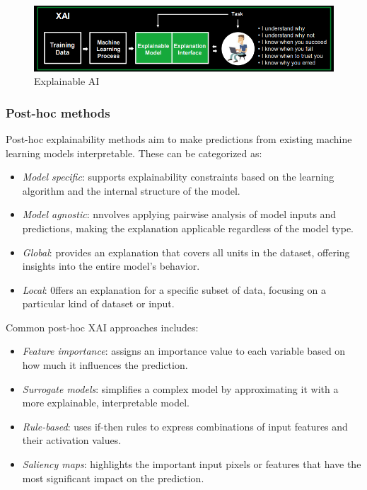\begin{figure}[H]
    \centering
    \includegraphics[width=0.5\linewidth]{images/bis6.png}
    \caption{Explainable AI}
\end{figure}

\subsubsection{Post-hoc methods}
Post-hoc explainability methods aim to make predictions from existing machine learning models interpretable. 
These can be categorized as:
\begin{itemize}
    \item \textit{Model specific}: supports explainability constraints based on the learning algorithm and the internal structure of the model.
    \item \textit{Model agnostic}: nnvolves applying pairwise analysis of model inputs and predictions, making the explanation applicable regardless of the model type.
    \item \textit{Global}: provides an explanation that covers all units in the dataset, offering insights into the entire model's behavior.
    \item \textit{Local}: 0ffers an explanation for a specific subset of data, focusing on a particular kind of dataset or input.
\end{itemize}
\noindent Common post-hoc XAI approaches includes:
\begin{itemize}
    \item \textit{Feature importance}: assigns an importance value to each variable based on how much it influences the prediction. 
    \item \textit{Surrogate models}: simplifies a complex model by approximating it with a more explainable, interpretable model.
    \item \textit{Rule-based}: uses if-then rules to express combinations of input features and their activation values.
    \item \textit{Saliency maps}: highlights the important input pixels or features that have the most significant impact on the prediction.
\end{itemize}

